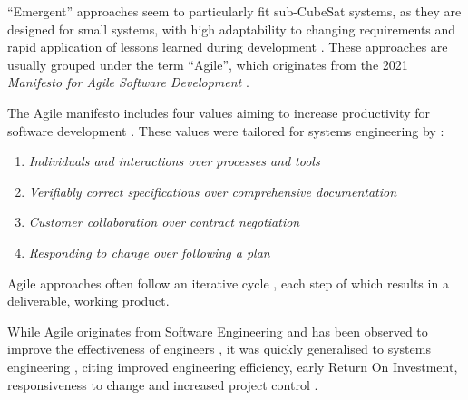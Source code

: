\documentclass[journal,10pt]{IEEEtran}
\begin{document}
\begin{table}[t]
\end{table}

``Emergent'' approaches seem to particularly fit sub-CubeSat systems, as they are designed for small systems, with high adaptability to changing requirements and rapid application of lessons learned during development \autocite{sebok_drivers}. These approaches are usually grouped under the term ``Agile'', which originates from the 2021 \emph{Manifesto for Agile Software Development} \autocite{beckAgileManifesto2001}. %


The Agile manifesto includes four values aiming to increase productivity for software development \autocite{beckAgileManifesto2001}.
These values were tailored for systems engineering by \citeauthor{douglassAgileSystemsEngineering2015} \autocite{douglassAgileSystemsEngineering2015}:
\begin{enumerate}[itemsep=0pt]
	\item \emph{Individuals and interactions over processes and tools}
	\item \emph{Verifiably correct specifications over comprehensive documentation}
	\item \emph{Customer collaboration over contract negotiation}
	\item \emph{Responding to change over following a plan}
\end{enumerate}
Agile approaches often follow an iterative cycle \autocite{HEEAGER201822}, each step of which results in a deliverable, working product. 

While Agile originates from Software Engineering and has been observed to improve the effectiveness of engineers \autocite{15thAnnualState,StatusQuoScaled}, it was quickly generalised to systems engineering \autocite{haberfellnerAgileSystemsEngineeringAgileSystems2005}, citing improved engineering efficiency, early Return On Investment, responsiveness to change and increased project control \autocite{douglassAgileSystemsEngineering2015,kohlbacherAgileSoftwareDevelopment2011,darrinAgileManifestoDesign2017}. 
\end{document}
